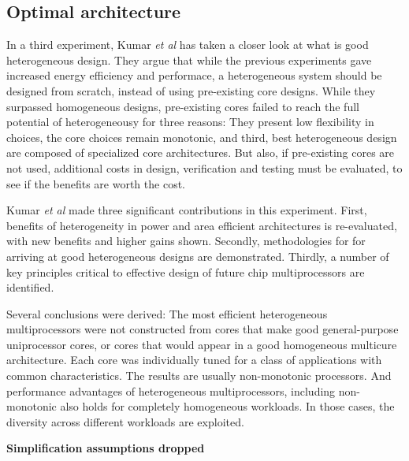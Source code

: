 \subsection{Optimal architecture}
\label{subsec:rw_arch}
In a third experiment, Kumar \textit{et al}\cite{heterogeneous-arch} has taken a closer look at what is good heterogeneous design.
They argue that while the previous experiments gave increased energy efficiency and performace, a heterogeneous system should be designed from scratch, instead of using pre-existing core designs.
While they surpassed homogeneous designs, pre-existing cores failed to reach the full potential of heterogeneousy for three reasons: They present low flexibility in choices, the core choices remain monotonic, and third, best heterogeneous design are composed of specialized core architectures\cite{heterogeneous-arch}.
But also, if pre-existing cores are not used, additional costs in design, verification and testing must be evaluated, to see if the benefits are worth the cost.

Kumar \textit{et al} made three significant contributions in this experiment. 
First, benefits of heterogeneity in power and area efficient architectures is re-evaluated, with new benefits and higher gains shown.
Secondly, methodologies for for arriving at good heterogeneous designs are demonstrated.
Thirdly, a number of key principles critical to effective design of future chip multiprocessors are identified.

Several conclusions were derived:
The most efficient heterogeneous multiprocessors were not constructed from cores that make good general-purpose uniprocessor cores, or cores that would appear in a good homogeneous multicure architecture.
Each core was individually tuned for a class of applications with common characteristics.
The results are usually non-monotonic processors.
And performance advantages of heterogeneous multiprocessors, including non-monotonic also holds for completely homogeneous workloads.
In those cases, the diversity across different workloads are exploited.

\textbf{Simplification assumptions dropped}


